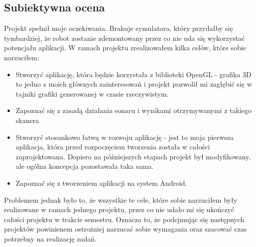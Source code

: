 \documentclass[a4paper,12pt]{article}
\begin{document}
\subsection{Subiektywna ocena}
Projekt spełnił moje oczekiwania. Brakuje symulatora, który przydałby się tymbardziej, że robot zostanie zdemontowany przez co nie uda się wykorzystać potencjału aplikacji. W ramach projektu zrealizowałem kilka celów, które sobie narzuciłem:
\begin{itemize}
\item Stworzyć aplikację, która będzie korzystała z biblioteki OpenGL - grafika 3D to jedno z moich głównych zainteresowań i projekt pozwolił mi zagłębić się w tajniki grafiki generowanej w czasie rzeczywistym.
\item Zapoznać się z zasadą działania sonaru i wynikami otrzymywanymi z takiego skanera
\item Stworzyć stosunkowo łatwą w rozwoju aplikację - jest to moja pierwsza aplikacja, która przed rozpoczęciem tworzenia została w całości zaprojektowana. Dopiero na późniejszych etapach projekt był modyfikowany, ale ogólna koncepcja pozostawała taka sama.
\item Zapoznać się z tworzeniem aplikacji na system Android.
\end{itemize}
Problemem jednak było to, że wszystkie te cele, które sobie narzuciłem były realizowane w ramach jednego projektu, przez co nie udało mi się ukończyć całości projektu w trakcie semestru. Oznacza to, że podejmując się następnych projektów powinienem ostrożniej narzucać sobie wymagania oraz szacować czas potrzebny na realizację zadań. 
\end{document}
